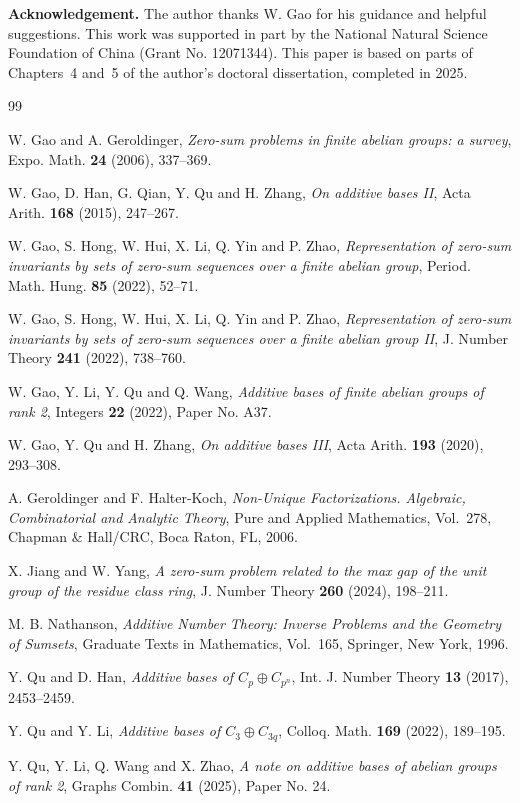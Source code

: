 \documentclass[10pt,a4paper]{amsart}
\theoremstyle{definition}
\theoremstyle{remark}
\numberwithin{equation}{section}
\begin{document}
\bigskip
\noindent
{\bf Acknowledgement.}
The author thanks W. Gao for his guidance and helpful suggestions.
This work was supported in part by the National Natural Science Foundation
of China (Grant No. 12071344).
This paper is based on parts of Chapters~4 and~5 of the author's doctoral
dissertation, completed in 2025.


\begin{thebibliography}{99}

\bibitem{[GG2006]} W. Gao and A. Geroldinger,
\emph{Zero-sum problems in finite abelian groups: a survey},
Expo. Math. \textbf{24} (2006), 337--369.

\bibitem{[GHQQZ2015]} W. Gao, D. Han, G. Qian, Y. Qu and H. Zhang,
\emph{On additive bases II}, Acta Arith. \textbf{168} (2015), 247--267.

\bibitem{[GHHLYZ2022-1]} W. Gao, S. Hong, W. Hui, X. Li, Q. Yin and P. Zhao,
\emph{Representation of zero-sum invariants by sets of zero-sum
sequences over a finite abelian group},
Period. Math. Hung. \textbf{85} (2022), 52--71.

\bibitem{[GHHLYZ2022-2]} W. Gao, S. Hong, W. Hui, X. Li, Q. Yin and P. Zhao,
\emph{Representation of zero-sum invariants by sets of zero-sum
sequences over a finite abelian group II},
J. Number Theory \textbf{241} (2022), 738--760.

\bibitem{[GLQW2022]} W. Gao, Y. Li, Y. Qu and Q. Wang,
\emph{Additive bases of finite abelian groups of rank 2},
Integers \textbf{22} (2022), Paper No. A37.

\bibitem{[GQZ2020]} W. Gao, Y. Qu and H. Zhang,
\emph{On additive bases III}, Acta Arith. \textbf{193} (2020), 293--308.

\bibitem{[GH2006]} A. Geroldinger and F. Halter-Koch,
\emph{Non-Unique Factorizations. Algebraic, Combinatorial and Analytic Theory},
Pure and Applied Mathematics, Vol.~278, Chapman \& Hall/CRC,
Boca Raton, FL, 2006.

\bibitem{[JY2024]} X. Jiang and W. Yang,
\emph{A zero-sum problem related to the max gap of the unit group of the residue class ring},
J. Number Theory \textbf{260} (2024), 198--211.

\bibitem{[N1996]} M. B. Nathanson,
\emph{Additive Number Theory: Inverse Problems and the Geometry of Sumsets},
Graduate Texts in Mathematics, Vol.~165, Springer, New York, 1996.

\bibitem{[QH2017]} Y. Qu and D. Han,
\emph{Additive bases of $C_p\oplus C_{p^n}$},
Int. J. Number Theory \textbf{13} (2017), 2453--2459.

\bibitem{[QL2022]} Y. Qu and Y. Li,
\emph{Additive bases of $C_3\oplus C_{3q}$},
Colloq. Math. \textbf{169} (2022), 189--195.

\bibitem{[QLWZ2025]} Y. Qu, Y. Li, Q. Wang and X. Zhao,
\emph{A note on additive bases of abelian groups of rank 2},
Graphs Combin. \textbf{41} (2025), Paper No. 24.

\end{thebibliography}
\end{document}
